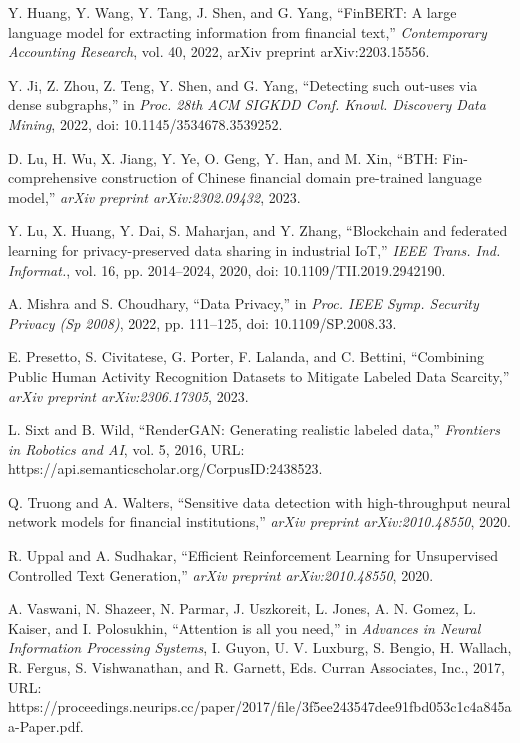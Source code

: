 \documentclass[a4paper,10pt]{article}
\begin{document}
\begin{thebibliography}{1}
Y. Huang, Y. Wang, Y. Tang, J. Shen, and G. Yang, ``FinBERT: A large language model for extracting information from financial text,'' \emph{Contemporary Accounting Research}, vol. 40, 2022, arXiv preprint arXiv:2203.15556.

Y. Ji, Z. Zhou, Z. Teng, Y. Shen, and G. Yang, ``Detecting such out-uses via dense subgraphs,'' in \emph{Proc. 28th ACM SIGKDD Conf. Knowl. Discovery Data Mining}, 2022, doi: 10.1145/3534678.3539252.

D. Lu, H. Wu, X. Jiang, Y. Ye, O. Geng, Y. Han, and M. Xin, ``BTH: Fin-comprehensive construction of Chinese financial domain pre-trained language model,'' \emph{arXiv preprint arXiv:2302.09432}, 2023.

Y. Lu, X. Huang, Y. Dai, S. Maharjan, and Y. Zhang, ``Blockchain and federated learning for privacy-preserved data sharing in industrial IoT,'' \emph{IEEE Trans. Ind. Informat.}, vol. 16, pp. 2014--2024, 2020, doi: 10.1109/TII.2019.2942190.

A. Mishra and S. Choudhary, ``Data Privacy,'' in \emph{Proc. IEEE Symp. Security Privacy (Sp 2008)}, 2022, pp. 111--125, doi: 10.1109/SP.2008.33.

E. Presetto, S. Civitatese, G. Porter, F. Lalanda, and C. Bettini, ``Combining Public Human Activity Recognition Datasets to Mitigate Labeled Data Scarcity,'' \emph{arXiv preprint arXiv:2306.17305}, 2023.

L. Sixt and B. Wild, ``RenderGAN: Generating realistic labeled data,'' \emph{Frontiers in Robotics and AI}, vol. 5, 2016, URL: https://api.semanticscholar.org/CorpusID:2438523.

Q. Truong and A. Walters, ``Sensitive data detection with high-throughput neural network models for financial institutions,'' \emph{arXiv preprint arXiv:2010.48550}, 2020.

R. Uppal and A. Sudhakar, ``Efficient Reinforcement Learning for Unsupervised Controlled Text Generation,'' \emph{arXiv preprint arXiv:2010.48550}, 2020.

A. Vaswani, N. Shazeer, N. Parmar, J. Uszkoreit, L. Jones, A. N. Gomez, L. Kaiser, and I. Polosukhin, ``Attention is all you need,'' in \emph{Advances in Neural Information Processing Systems}, I. Guyon, U. V. Luxburg, S. Bengio, H. Wallach, R. Fergus, S. Vishwanathan, and R. Garnett, Eds. Curran Associates, Inc., 2017, URL: https://proceedings.neurips.cc/paper/2017/file/3f5ee243547dee91fbd053c1c4a845aa-Paper.pdf.


\end{thebibliography}
\end{document}
